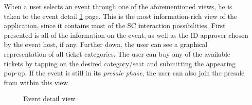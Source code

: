 When a user selects an event through one of the aforementioned views, he is taken to the event detail \ref{img:event-details} page. This is the most information-rich view of the application, since it contains most of the SC interaction possibilities. First presented is all of the information on the event, as well as the ID approver chosen by the event host, if any. Further down, the user can see a graphical representation of all ticket categories. The user can buy any of the available tickets by tapping on the desired category/seat and submitting the appearing pop-up. If the event is still in its \textit{presale phase}, the user can also join the presale from within this view. 
\begin{figure}[!tbp]
  \centering
  \hfill
    \hfill

  \caption{Event detail view}
  \label{img:event-details}
\end{figure}
